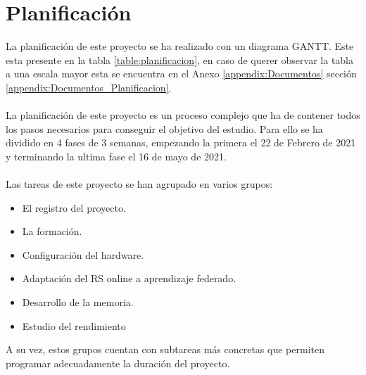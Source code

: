 \chapter{Planificación}
\thispagestyle{fancy}


La planificación de este proyecto se ha realizado con un diagrama GANTT. Este esta presente en la tabla \ref{table:planificacion}, en caso de querer observar la tabla a una escala mayor esta se encuentra en el Anexo \ref{appendix:Documentos} sección \ref{appendix:Documentos_Planificacion}.
\\ \\
La planificación de este proyecto es un proceso complejo que ha de contener todos los pasos necesarios para conseguir el objetivo del estudio. Para ello se ha dividido en 4 fases de 3 semanas, empezando la primera el 22 de Febrero de 2021 y terminando la ultima fase el 16 de mayo de 2021.
\\ \\
Las tareas de este proyecto se han agrupado en varios grupos:
\begin{itemize}
    \item El registro del proyecto.
    \item La formación.
    \item Configuración del hardware.
    \item Adaptación del RS online a aprendizaje federado.
    \item Desarrollo de la memoria.
    \item Estudio del rendimiento
\end{itemize}
A su vez, estos grupos cuentan con subtareas más concretas que permiten programar adecuadamente la duración del proyecto.
